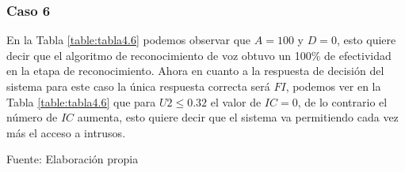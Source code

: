 \subsubsection{Caso 6}
En la Tabla \ref{table:tabla4.6} podemos observar que $A = 100$ y $D = 0$, esto quiere decir que el algoritmo de reconocimiento de voz obtuvo un 100\% de efectividad en la etapa de reconocimiento.
\vskip 0.5cm
Ahora en cuanto a la respuesta de decisión del sistema para este caso la única respuesta correcta será $FI$, podemos ver en la Tabla \ref{table:tabla4.6} que para $U2 \leq 0.32$ el valor de $IC = 0$, de lo contrario el número de $IC$ aumenta, esto quiere decir que el sistema va permitiendo cada vez más el acceso a intrusos.

\begin{center}
\begin{table}[H]
\centering
\caption{\small{Resultados para obtener U2 en el caso 6.}}
\label{table:tabla4.6}
\vskip 0.2cm
\begin{center}
\vskip 0.2cm
{\small{Fuente: Elaboración propia}}
\end{center}
\end{table}
\end{center}


